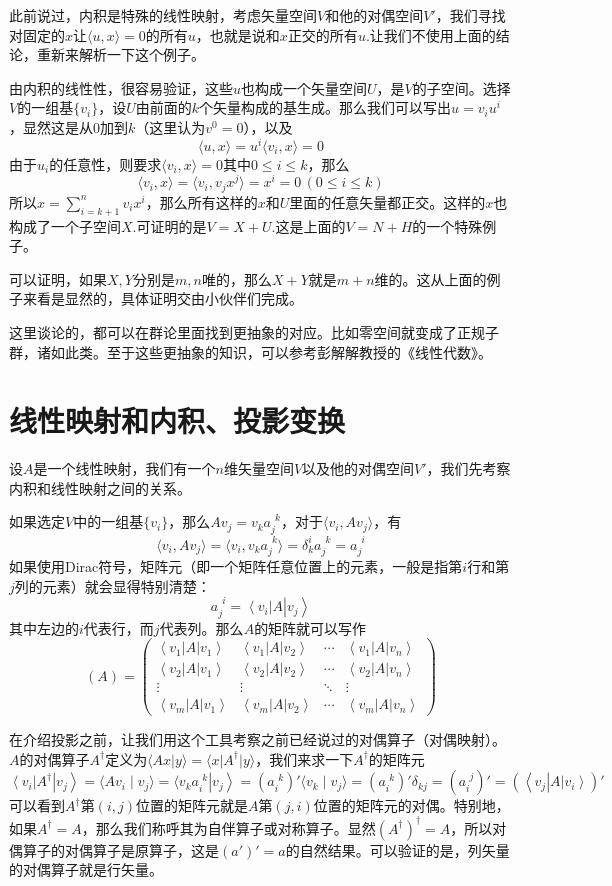 \documentclass[11pt,a4paper,openany]{book}%
\theoremstyle{plain}%
\newcommand{\bra}[1]{\left\langle #1\right|} %
\newcommand{\ket}[1]{\left| #1\right\rangle}
\newcommand{\braket}[2]{\langle #1 \mid #2 \rangle}
\begin{document}
此前说过，内积是特殊的线性映射，考虑矢量空间$V$和他的对偶空间$V'$，我们寻找对固定的$x$让$\langle u,x \rangle=0$的所有$u$，也就是说和$x$正交的所有$u$.让我们不使用上面的结论，重新来解析一下这个例子。

由内积的线性性，很容易验证，这些$u$也构成一个矢量空间$U$，是$V$的子空间。选择$V$的一组基$\{v_i\}$，设$U$由前面的$k$个矢量构成的基生成。那么我们可以写出$u=v_iu^i$，显然这是从0加到$k$（这里认为$v^0=0$），以及
\[
\langle u,x \rangle=u^i\langle v_i,x \rangle=0
\]
由于$u_i$的任意性，则要求$\langle v_i,x \rangle=0$其中$0\leq i \leq k$，那么
\[
\langle v_i,x \rangle=\langle v_i,v_j x^j\rangle=x^i=0\,(0\leq i \leq k)
\]
所以$x=\sum_{i=k+1}^n v_ix^i$，那么所有这样的$x$和$U$里面的任意矢量都正交。这样的$x$也构成了一个子空间$X$.可证明的是$V=X+U$.这是上面的$V=N+H$的一个特殊例子。

可以证明，如果$X,Y$分别是$m,n$唯的，那么$X+Y$就是$m+n$维的。这从上面的例子来看是显然的，具体证明交由小伙伴们完成。

这里谈论的，都可以在群论里面找到更抽象的对应。比如零空间就变成了正规子群，诸如此类。至于这些更抽象的知识，可以参考彭解解教授的《线性代数》。
\section{线性映射和内积、投影变换}
设$A$是一个线性映射，我们有一个$n$维矢量空间$V$以及他的对偶空间$V'$，我们先考察内积和线性映射之间的关系。

如果选定$V$中的一组基$\{v_{i}\}$，那么$Av_{j}=v_{k}a_{j}^{\phantom{j}k}$，对于$\langle v_i,Av_j \rangle$，有
\[
\langle v_i,Av_j \rangle=\langle v_i,v_{k}a_{j}^{\phantom{j}k} \rangle=\delta_{k}^i a_{j}^{\phantom{j}k} =a_{j}^{\phantom{j}i}
\]
如果使用Dirac符号，矩阵元（即一个矩阵任意位置上的元素，一般是指第$i$行和第$j$列的元素）就会显得特别清楚：
\[
a_{j}^{\phantom{j}i}=\bra{v_i}A\ket{v_j}
\]
其中左边的$i$代表行，而$j$代表列。那么$A$的矩阵就可以写作
\[
(A)=\begin{pmatrix}
\bra{v_1}A\ket{v_1}& \bra{v_1}A\ket{v_2} & \cdots & \bra{v_1}A\ket{v_n}\\
\bra{v_2}A\ket{v_1}& \bra{v_2}A\ket{v_2} & \cdots & \bra{v_2}A\ket{v_n}\\
\vdots & \vdots & \ddots & \vdots \\
\bra{v_m}A\ket{v_1}& \bra{v_m}A\ket{v_2} & \cdots & \bra{v_m}A\ket{v_n}
\end{pmatrix}
\]

在介绍投影之前，让我们用这个工具考察之前已经说过的对偶算子（对偶映射）。$A$的对偶算子$A^\dag$定义为$\langle Ax|y \rangle=\langle x|A^\dag|y \rangle$，我们来求一下$A^\dag$的矩阵元
\[
\bra{v_i}A^\dag\ket{v_j}=\braket{Av_i}{v_j}=\langle v_ka_i^{\phantom{i}k}\ket{v_j}=(a_i^{\phantom{i}k})'\braket{v_k}{v_j}=(a_i^{\phantom{i}k})'\delta_{kj}=(a_{i}^{\phantom{i}j})'=(\bra{v_j}A\ket{v_i})'
\]
可以看到$A^\dag$第$(i,j)$位置的矩阵元就是$A$第$(j,i)$位置的矩阵元的对偶。特别地，如果$A^\dag=A$，那么我们称呼其为{\kaishu 自伴算子}或{\kaishu 对称算子}。显然$(A^\dag)^\dag=A$，所以对偶算子的对偶算子是原算子，这是$(a')'=a$的自然结果。可以验证的是，列矢量的对偶算子就是行矢量。
\end{document}
